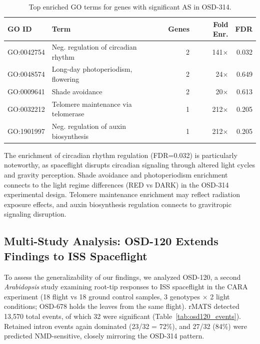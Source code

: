 \documentclass[12pt,a4paper]{article}
\begin{document}
\begin{table}[h]
\centering
\caption{Top enriched GO terms for genes with significant AS in OSD-314.}
\label{tab:go_enrichment}
\begin{tabular}{llrrr}
\toprule
\textbf{GO ID} & \textbf{Term} & \textbf{Genes} & \textbf{Fold Enr.} & \textbf{FDR} \\
\midrule
GO:0042754 & Neg. regulation of circadian rhythm & 2 & 141$\times$ & 0.032 \\
GO:0048574 & Long-day photoperiodism, flowering & 2 & 24$\times$ & 0.649 \\
GO:0009641 & Shade avoidance & 2 & 20$\times$ & 0.613 \\
GO:0032212 & Telomere maintenance via telomerase & 1 & 212$\times$ & 0.205 \\
GO:1901997 & Neg. regulation of auxin biosynthesis & 1 & 212$\times$ & 0.205 \\
\bottomrule
\end{tabular}
\end{table}

The enrichment of circadian rhythm regulation (FDR=0.032) is particularly noteworthy, as spaceflight disrupts circadian signaling through altered light cycles and gravity perception. Shade avoidance and photoperiodism enrichment connects to the light regime differences (RED vs DARK) in the OSD-314 experimental design. Telomere maintenance enrichment may reflect radiation exposure effects, and auxin biosynthesis regulation connects to gravitropic signaling disruption.

\subsection{Multi-Study Analysis: OSD-120 Extends Findings to ISS Spaceflight}

To assess the generalizability of our findings, we analyzed OSD-120, a second \textit{Arabidopsis} study examining root-tip responses to ISS spaceflight in the CARA experiment (18 flight vs 18 ground control samples, 3 genotypes $\times$ 2 light conditions; OSD-678 holds the leaves from the same flight). rMATS detected 13,570 total events, of which 32 were significant (Table~\ref{tab:osd120_events}). Retained intron events again dominated (23/32 = 72\%), and 27/32 (84\%) were predicted NMD-sensitive, closely mirroring the OSD-314 pattern.
\end{document}
